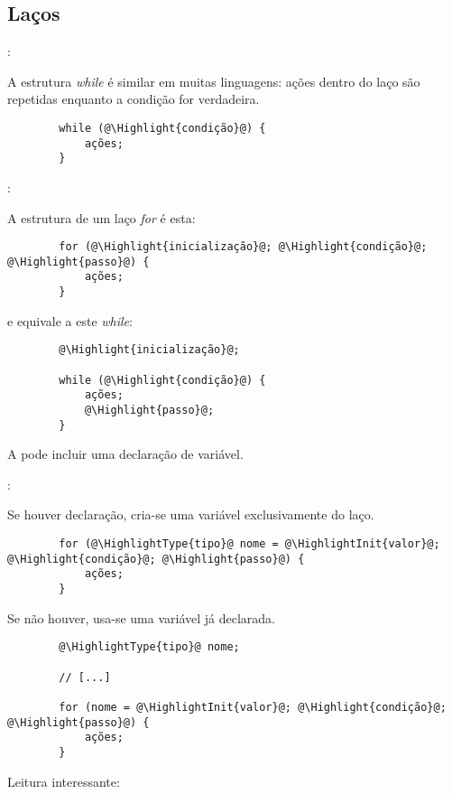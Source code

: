 \subsection{Laços}


\begin{frame}[fragile]{\insertsection: \insertsubsection}

	A estrutura \emph{while} é similar em muitas linguagens: ações dentro do laço são repetidas enquanto a condição for verdadeira.
	\begin{verbatim}
		while (@\Highlight{condição}@) {
			ações;
		}
	\end{verbatim}

\end{frame}


\begin{frame}[fragile]{\insertsection: \insertsubsection}

	A estrutura de um laço \emph{for} é esta:
	\begin{verbatim}
		for (@\Highlight{inicialização}@; @\Highlight{condição}@; @\Highlight{passo}@) {
			ações;
		}
	\end{verbatim}
	e equivale a este \emph{while}:
	\begin{verbatim}
		@\Highlight{inicialização}@;

		while (@\Highlight{condição}@) {
			ações;
			@\Highlight{passo}@;
		}
	\end{verbatim}

	A  pode incluir uma declaração de variável.

\end{frame}


\begin{frame}[b,fragile]{\insertsection: \insertsubsection}

	Se houver declaração, cria-se uma variável exclusivamente do laço.
	\begin{verbatim}
		for (@\HighlightType{tipo}@ nome = @\HighlightInit{valor}@; @\Highlight{condição}@; @\Highlight{passo}@) {
			ações;
		}
	\end{verbatim}

	Se não houver, usa-se uma variável já declarada.
	\begin{verbatim}
		@\HighlightType{tipo}@ nome;

		// [...]

		for (nome = @\HighlightInit{valor}@; @\Highlight{condição}@; @\Highlight{passo}@) {
			ações;
		}
	\end{verbatim}

	\vfill
	Leitura interessante: 

\end{frame}


